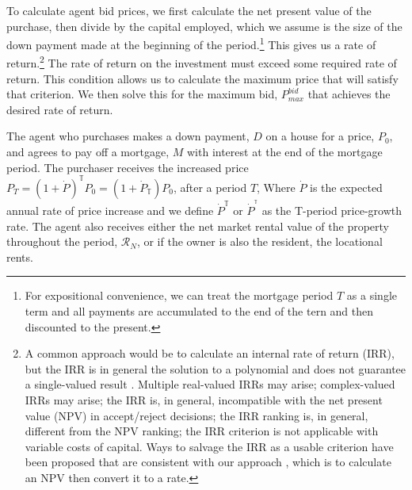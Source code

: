{To calculate agent bid prices, we first calculate the net present value of the purchase, then divide by the capital employed, which we assume is the size of the down payment made at the beginning of the period.\footnote{For expositional convenience, we can treat the mortgage period $T$ as a single term and all payments are accumulated to the end of the tern and then discounted to the present.} 
 This gives us a rate of return.\footnote{A common approach would be to calculate an internal rate of return (IRR), but  the IRR is in general the solution to a polynomial and does not guarantee a single-valued result \cite{robinsonOptimalTerminationIRR1996}. Multiple real-valued  IRRs may arise;  complex-valued IRRs may arise;  the IRR is, in general, incompatible with the net present value (NPV) in accept/reject decisions; the IRR ranking is, in general, different from the NPV ranking; the IRR criterion is not applicable with variable costs of capital. Ways to salvage the IRR as a usable criterion have been proposed that are consistent with our approach \cite{magniAverageInternalRate2010}, which is to calculate an NPV then convert it to a rate.} 
The rate of return on the investment must exceed some required rate of return. This condition allows us to calculate the maximum price that will satisfy that criterion.
We then solve this for  the maximum bid, $P_{max}^{bid}$ that achieves the desired rate of return. 

The agent who purchases makes a down payment, $D$ on a house for a price, $P_0$, and agrees to pay off a mortgage, $M$ with interest at the end of the mortgage period.  The purchaser  receives the increased price 
$P_T = (1 + \dot P)^\mathbb{T}P_0 =(1+\dot P_\mathbb{T})P_0 $, 
after a period $T$, Where $\dot P$  is the expected annual rate of price increase and we define $\dot P^\mathbb{T}$
or $\dot P^{^\mathbb{T}}$ 
as the T-period  price-growth rate. The agent also receives either the net market rental value of the property throughout the period, $\mathcal{R}_N$, or if the owner is also the resident, the locational rents. 
 

}

